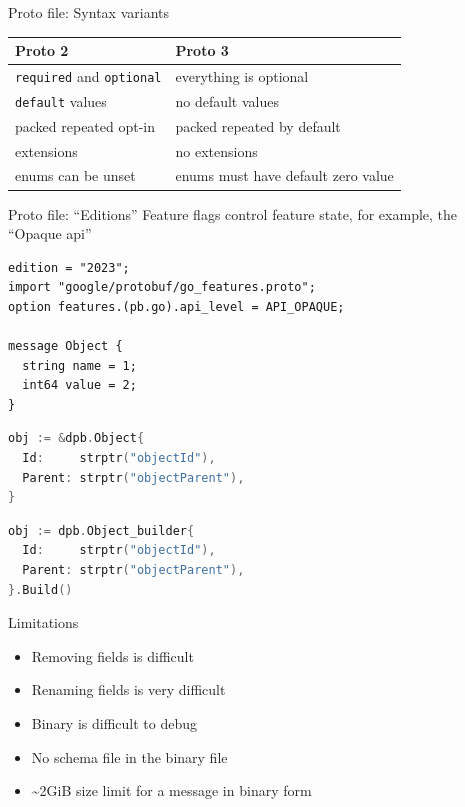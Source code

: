 \documentclass{beamer}
\def\code#1{\texttt{#1}}
\begin{document}
\begin{frame}{Proto file: Syntax variants}
  \begin{center}
    \begin{tabular}{ l l }
      Proto 2 & Proto 3 \\
      \hline
      \code{required} and \code{optional} & everything is optional \\
      \code{default} values & no default values \\
      packed repeated opt-in & packed repeated by default \\
      extensions & no extensions \\
      enums can be unset & enums must have default zero value
    \end{tabular}
  \end{center}
\end{frame}

\begin{frame}[fragile]{Proto file: ``Editions''}
Feature flags control feature state, for example, the ``Opaque api''
\begin{lstlisting}[caption={Protobuf definition}]
edition = "2023";
import "google/protobuf/go_features.proto";
option features.(pb.go).api_level = API_OPAQUE;

message Object {
  string name = 1;
  int64 value = 2;
}
\end{lstlisting}

\begin{minipage}{.49\textwidth}
\begin{lstlisting}[language=go,caption={Mutable}]
obj := &dpb.Object{
  Id:     strptr("objectId"),
  Parent: strptr("objectParent"),
}
\end{lstlisting}
\end{minipage}
\begin{minipage}{.49\textwidth}
\begin{lstlisting}[language=go,caption={Immutable},numbers=none]
obj := dpb.Object_builder{
  Id:     strptr("objectId"),
  Parent: strptr("objectParent"),
}.Build()
\end{lstlisting}
\end{minipage}
\end{frame}

\begin{frame}{Limitations}
\begin{itemize}[label=\Sey{}]
\item Removing fields is difficult
\item Renaming fields is very difficult
\item Binary is difficult to debug
\item No schema file in the binary file
\item \textasciitilde2GiB size limit for a message in binary form
\end{itemize}
\end{frame}
\end{document}

